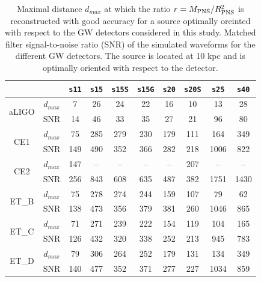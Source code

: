 \begin{table}
  \centering
  \begin{tabular}{c|c|cccccccc}
    
    
\multicolumn{2}{c|}{}  & \texttt{s11} & \texttt{s15} & \texttt{s15S} & \texttt{s15G} & \texttt{s20} & \texttt{s20S} & \texttt{s25}  & \texttt{s40}\\   

\hline
\multirow{2}{*}{aLIGO} & $d_{max}$ & 7  & 26 & 24 & 22 & 16 & 10 & 13 & 28\\
\cline{2-10}
                       & SNR      & 14 & 46 & 33 & 35 & 27 & 21 & 96 & 80\\
\hline
\hline
\multirow{2}{*}{CE1} & $d_{max}$ &  75  & 285 & 279 & 230 & 179 & 111 & 164  & 349\\
\cline{2-10}
                       & SNR    &  149 & 490 & 352 & 366 & 282 & 218 & 1006 & 822\\

\hline
\multirow{2}{*}{CE2} & $d_{max}$ & 147  & -- & -- & -- & -- & 207 & --  & --\\
\cline{2-10}
                       & SNR    & 256 & 843 & 608 & 635 & 487 & 382 & 1751 & 1430\\

\hline
\multirow{2}{*}{ET\_B} & $d_{max}$ & 75  & 278 & 274 & 244 & 159 & 107 & 79   & 62\\
\cline{2-10}
                       & SNR      & 138 & 473 & 356 & 379 & 381 & 260 & 1046 & 865\\

\hline
\multirow{2}{*}{ET\_C} & $d_{max}$ & 71  & 271 & 239 & 222 & 154 & 119 & 104  & 165\\
\cline{2-10}
                       & SNR      & 126 & 432 & 320 & 338 & 252 & 213 & 945 & 783\\

\hline
\multirow{2}{*}{ET\_D} & $d_{max}$ & 79  & 306 & 264 & 252 & 179 & 131 & 134  & 349\\
\cline{2-10}
                       & SNR      & 140 & 477 & 352 & 371 & 277 & 227 & 1034 & 859 \\

  \end{tabular}
  \caption{%
    Maximal distance $d_{max}$ at which the ratio $r=M_{\rm PNS}/R_{\rm PNS}^2$ is reconstructed
    with good accuracy for a source optimally oreinted with respect to the GW detectors
    considered in this study.
    Matched filter signal-to-noise ratio (SNR) of the simulated waveforms for
    the different GW detectors. The source is located at 10 kpc and is optimally oriented
    with respect to the detector.
  }
  \label{tab:results}
\end{table}

